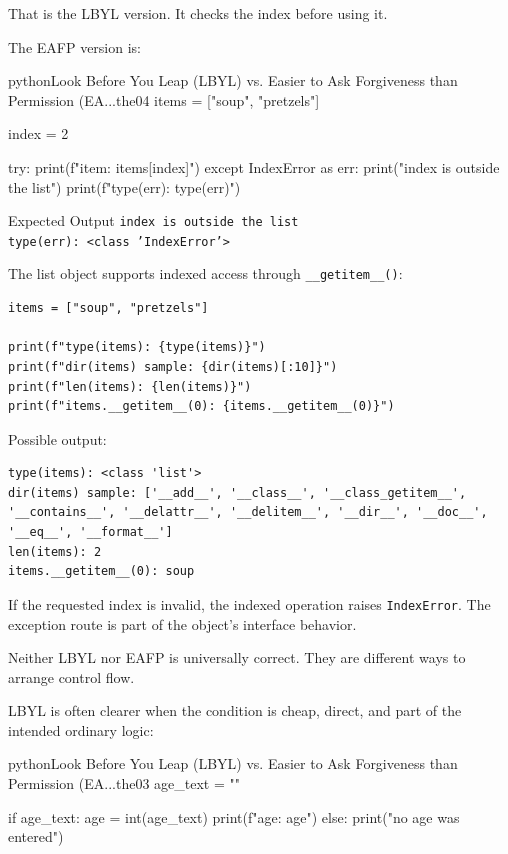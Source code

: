 \documentclass[a4paper,twoside]{report}
\begin{document}
That is the LBYL version. It checks the index before using it.

The EAFP version is:

\begin{codebox}[]{python}{Look Before You Leap (LBYL) vs. Easier to Ask Forgiveness than Permission (EA...}{the04}
items = ["soup", "pretzels"]

index = 2

try:
    print(f"item: {items[index]}")
except IndexError as err:
    print("index is outside the list")
    print(f"type(err): {type(err)}")
\end{codebox}


\begin{iobox}{Expected Output}
\texttt{index is outside the list} \\
\texttt{type(err): <class 'IndexError'>} \\
\end{iobox}


The list object supports indexed access through \texttt{\_\_getitem\_\_()}:

\begin{verbatim}
items = ["soup", "pretzels"]

print(f"type(items): {type(items)}")
print(f"dir(items) sample: {dir(items)[:10]}")
print(f"len(items): {len(items)}")
print(f"items.__getitem__(0): {items.__getitem__(0)}")
\end{verbatim}

Possible output:

\begin{verbatim}
type(items): <class 'list'>
dir(items) sample: ['__add__', '__class__', '__class_getitem__',
'__contains__', '__delattr__', '__delitem__', '__dir__', '__doc__',
'__eq__', '__format__']
len(items): 2
items.__getitem__(0): soup
\end{verbatim}

If the requested index is invalid, the indexed operation raises \texttt{IndexError}. The exception route is part of the object's interface behavior.

Neither LBYL nor EAFP is universally correct. They are different ways to arrange control flow.

LBYL is often clearer when the condition is cheap, direct, and part of the intended ordinary logic:

\begin{codebox}[]{python}{Look Before You Leap (LBYL) vs. Easier to Ask Forgiveness than Permission (EA...}{the03}
age_text = ""

if age_text:
    age = int(age_text)
    print(f"age: {age}")
else:
    print("no age was entered")
\end{codebox}
\end{document}

